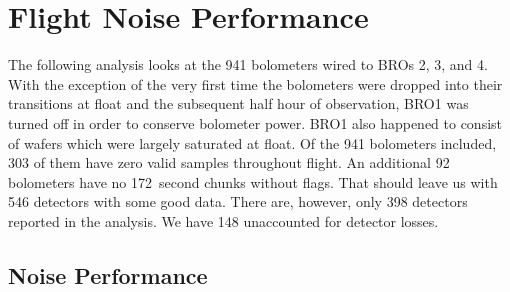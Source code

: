

\section{Flight Noise Performance}
\label{flight_noise_performance}

The following analysis looks at the 941 bolometers wired to \ac{BRO}s 2, 3, and 4. 
With the exception of the very first time the bolometers were dropped into their transitions at float and the subsequent half hour of observation, \ac{BRO}1 was turned off in order to conserve bolometer power. \ac{BRO}1 also happened to consist of wafers which were largely saturated at float. 
Of the 941 bolometers included, 303 of them have zero valid samples throughout flight. 
An additional 92 bolometers have no 172~second chunks without flags. 
That should leave us with 546 detectors with some good data. 
There are, however, only 398 detectors reported in the analysis. 
We have 148 unaccounted for detector losses. 

\subsection{Noise Performance}
\label{sec:noise_performance}


